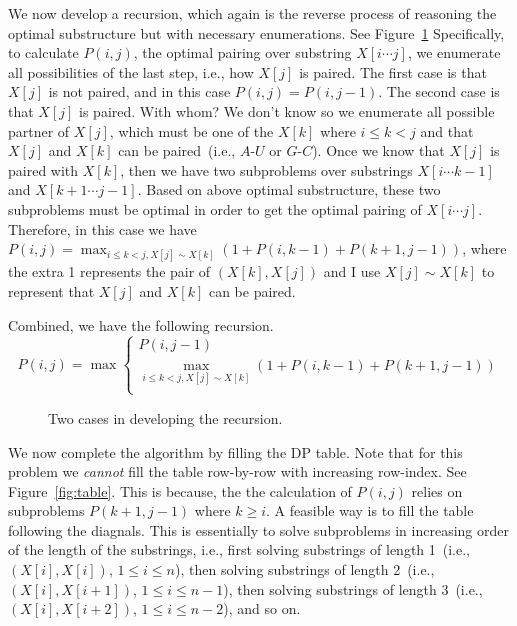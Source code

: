 We now develop a recursion, which again is the reverse process of reasoning the optimal substructure
but with necessary enumerations.
See Figure~\ref{fig:recursion}
Specifically, to calculate $P(i,j)$, the optimal pairing over substring $X[i\cdots j]$,
we enumerate all possibilities of the last step, i.e., how $X[j]$ is paired.
The first case is that $X[j]$ is not paired, and in this case $P(i,j) = P(i, j-1)$.
The second case is that $X[j]$ is paired. With whom? We don't know so we enumerate
all possible partner of $X[j]$, which must be one of the $X[k]$ where $i \le k < j$
and that $X[j]$ and $X[k]$ can be paired~(i.e., $A$-$U$ or $G$-$C$).
Once we know that $X[j]$ is paired with $X[k]$, then we have two subproblems
over substrings $X[i\cdots k-1]$ and $X[k + 1 \cdots j - 1]$. Based on above optimal substructure,
these two subproblems must be optimal in order to get the optimal pairing of $X[i\cdots j]$.
Therefore, in this case we have $P(i,j) = \max_{i \le k < j, X[j]\sim X[k] } (1 + P(i, k-1) + P(k+1,j-1))$, where
the extra 1 represents the pair of $(X[k], X[j])$ and I use $X[j]\sim X[k]$ to represent that $X[j]$ and $X[k]$ can be paired.

Combined, we have the following recursion.
\begin{displaymath}
P(i,j) = \max\left\{
	\begin{array}{llll}
	P(i,j-1)\\
	\textstyle \max_{i \le k < j, X[j]\sim X[k]} (1 + P(i,k-1) + P(k+1,j-1)) \\
	\end{array}
\right.
\end{displaymath}

\begin{figure}[h]
\centering{}
\caption{Two cases in developing the recursion.}
\label{fig:recursion}
\end{figure}


We now complete the algorithm by filling the DP table.
Note that for this problem we \emph{cannot} fill the table row-by-row with increasing row-index.
See Figure~\ref{fig:table}.
This is because, the the calculation of $P(i,j)$ relies on subproblems $P(k + 1, j - 1)$ where $k \ge i$.
A feasible way is to fill the table following the diagnals.
This is essentially to solve subproblems in increasing order of the length of the substrings, i.e.,
first solving substrings of length 1~(i.e., $(X[i], X[i])$, $1\le i \le n$), 
then solving substrings of length 2~(i.e., $(X[i], X[i + 1])$, $1\le i \le n - 1$), 
then solving substrings of length 3~(i.e., $(X[i], X[i + 2])$, $1\le i \le n - 2$),
and so on. 

